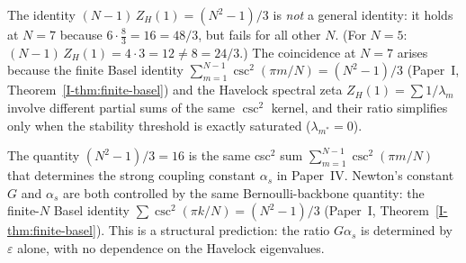 \begin{remark}[The identity $(N{-}1)\,Z_H(1) = (N^2{-}1)/3$ at $N = 7$]
\label{rem:zh1-identity}
The identity $(N{-}1)\,Z_H(1) = (N^2{-}1)/3$ is \emph{not}
a general identity: it holds at $N = 7$ because
$6 \cdot \tfrac{8}{3} = 16 = 48/3$, but fails for all
other $N$.  (For $N = 5$:
$(N{-}1)\,Z_H(1) = 4 \cdot 3 = 12 \ne 8 = 24/3$.)
The coincidence at $N = 7$ arises because the finite
Basel identity
$\sum_{m=1}^{N-1}\csc^2(\pi m/N) = (N^2{-}1)/3$
(Paper~I, Theorem~\ref*{I-thm:finite-basel})
and the Havelock spectral zeta $Z_H(1) = \sum 1/\lambda_m$
involve different partial sums of the same $\csc^2$ kernel,
and their ratio simplifies only when the
stability threshold is exactly saturated ($\lambda_{m^*} = 0$).
\end{remark}

\begin{remark}
\label{rem:G-alpha-s}
The quantity $(N^2{-}1)/3 = 16$ is the same csc$^2$ sum
$\sum_{m=1}^{N-1}\csc^2(\pi m/N)$ that determines
the strong coupling constant $\alpha_s$ in Paper~IV.
Newton's constant~$G$ and $\alpha_s$
are both controlled by the same Bernoulli-backbone quantity:
the finite-$N$ Basel identity
$\sum\csc^2(\pi k/N) = (N^2{-}1)/3$
(Paper~I, Theorem~\ref*{I-thm:finite-basel}).
This is a structural prediction: the ratio $G\alpha_s$
is determined by $\varepsilon$ alone,
with no dependence on the Havelock eigenvalues.
\end{remark}


